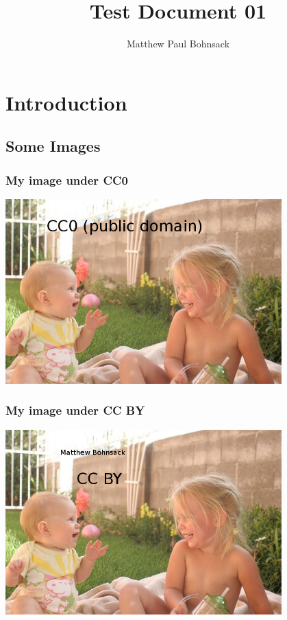 \documentclass[mathserif,xcolor=dvipsnames,hyperref={bookmarks=true}]{beamer}
\title{Test Document 01}
\author[Matthew Bohnsack]{Matthew Paul Bohnsack}
\institute[UNM]{University of New Mexico\\Albuquerque, New Mexico USA}
\begin{document}
\begin{frame}
    \titlepage
\end{frame}

\section{Introduction}

\subsection{Some Images}

\begin{frame}[t]
    \frametitle{My image under CC0}
    \begin{center}
        \includegraphics[width=0.8\textwidth]{../images/mine/cc0.jpg}
    \end{center}
\end{frame}
\begin{frame}[t]
    \frametitle{My image under CC BY}
    \begin{center}
        \includegraphics[width=0.8\textwidth]{../images/mine/cc-by.jpg}
    \end{center}
\end{frame}
\end{document}

